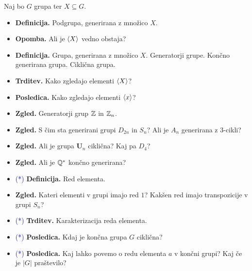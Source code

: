 \begin{enumerate}
    Naj bo \(G\) grupa ter \(X \subseteq G\).
    \begin{itemize}
        \item \textbf{Definicija.} Podgrupa, generirana z množico \(X\).
        \item \textbf{Opomba.} Ali je \(\langle {X} \rangle\) vedno obstaja?
        \item \textbf{Definicija.} Grupa, generirana z množico \(X\). Generatorji grupe. Končno generirana grupa. Ciklična grupa.
        \item \textbf{Trditev.} Kako zgledajo elementi \(\langle {X} \rangle\)?
        \item \textbf{Posledica.} Kako zgledajo elementi \(\langle {x} \rangle\)?
        \item \textbf{Zgled.} Generatorji grup \(\mathbb{Z}\) in \(\mathbb{Z}_n\). 
        \item \textbf{Zgled.} S čim sta generirani grupi \(D_{2n}\) in \(S_n\)? Ali je \(A_n\) generirana z 3-cikli?
        \item \textbf{Zgled.} Ali je grupa \(\textbf{U}_n\) ciklična? Kaj pa \(D_4\)?
        \item \textbf{Zgled.} Ali je \(\mathbb{Q}^*\) končno generirana?
        \item \textcolor{blue}{(*)}  \textbf{Definicija.} Red elementa.
        \item \textbf{Zgled.} Kateri elementi v grupi imajo red \(1\)? Kakšen red imajo transpozicije v grupi \(S_n\)?
        \item \textcolor{blue}{(*)} \textbf{Trditev.} Karakterizacija reda elementa.
        \item \textcolor{blue}{(*)} \textbf{Posledica.} Kdaj je končna grupa \(G\) ciklična?
        \item \textcolor{blue}{(*)} \textbf{Posledica.} Kaj lahko povemo o redu elementa \(a\) v končni grupi? Kaj če je \(|G|\) praštevilo?
    \end{itemize}
\end{enumerate}

\newpage
